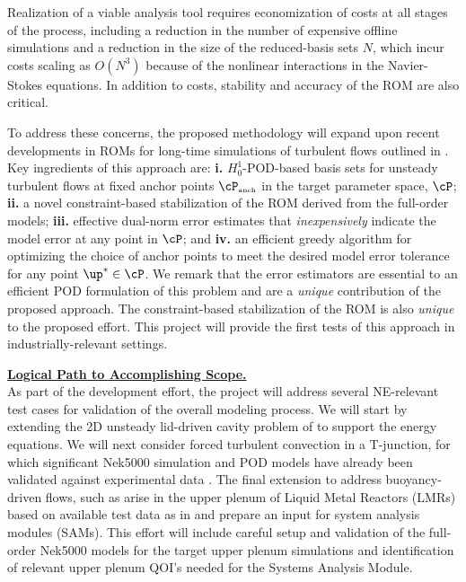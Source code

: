 {Realization of a viable analysis tool requires economization of costs at all
stages of the process, including a reduction in the number of expensive
offline simulations and a reduction in the size of the
reduced-basis sets $N$, which incur costs scaling as $O(N^3)$ because 
of the nonlinear interactions in the Navier-Stokes equations.
In addition to costs, stability and accuracy of the ROM are also critical.

  To address these concerns, the proposed methodology will expand upon recent
developments in ROMs for long-time simulations of turbulent flows outlined in
\cite{fick18}.  Key ingredients of this approach are:
 \textbf{i.} $H^1_0$-POD-based basis sets for unsteady turbulent flows
         at fixed anchor points $\cP_{\mbox{\tiny anch}}$ in the target
         parameter space, $\cP$;
 \textbf{ii.} a novel constraint-based stabilization of the ROM derived
          from the full-order models;
 \textbf{iii.} effective dual-norm error estimates that {\em inexpensively}
           indicate the model error at any point in $\cP$; and
 \textbf{iv.} an efficient greedy algorithm for optimizing the choice of
          anchor points to meet the desired model error tolerance 
          for any point $\up^* \in \cP$.
We remark that the error estimators are essential to an efficient POD
formulation of this problem and are a {\em unique} contribution of the proposed
approach.  The constraint-based stabilization of the ROM is also {\em unique}
to the proposed effort.  This project will provide the first tests of this
approach in industrially-relevant settings.   

\vspace*{.08in}\noindent \underline{\textbf{ Logical Path to Accomplishing Scope.}} \\[-2ex]

As part of the development effort, the project will address several NE-relevant
test cases for validation of the overall modeling process.  We will start by
extending the 2D unsteady lid-driven cavity problem of \cite{fick18} to support
the energy equations.  We will next consider forced turbulent convection in a
T-junction, for which significant Nek5000 simulation and POD models have
already been validated against experimental data \cite{merzari11b}.
The final extension to address buoyancy-driven flows, such as arise in
the upper plenum
of Liquid Metal Reactors (LMRs) \cite{mbd1,mbd2,mbd3} based on available test data
as in \cite{mbd4} and prepare an input for system analysis modules (SAMs).  This
effort will include careful setup and validation of the full-order Nek5000 models 
for the target upper plenum simulations and identification of relevant 
upper plenum QOI's needed for the Systems Analysis Module.
\\[-1ex]



}
